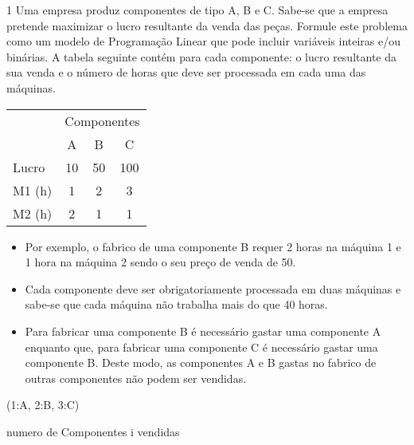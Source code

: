 \documentclass[\mainfilename]{subfiles}
\begin{document}
\begin{questionBox}1{ %
    Uma empresa produz componentes de tipo A, B e C. Sabe-se que a empresa pretende maximizar o lucro resultante da venda das peças. Formule este problema como um modelo de Programação Linear que pode incluir variáveis inteiras e/ou binárias.
} %
    A tabela seguinte contém para cada componente: o lucro resultante da sua venda e o número de horas que deve ser processada em cada uma das máquinas.
    \begin{center}
        \begin{tabular}{l *{3}{c}}
            
            \\\toprule
            
                & \multicolumn{3}{c}{Componentes}
                \\
                & \multicolumn{1}{c}{A}
                & \multicolumn{1}{c}{B}
                & \multicolumn{1}{c}{C}
            
            \\\midrule
            
                Lucro & 10 & 50 & 100
                \\ M1 (\unit{\hour}) & 1 & 2 & 3
                \\ M2 (\unit{\hour}) & 2 & 1 & 1
            
            \\\bottomrule
            
        \end{tabular}
    \end{center}

    \begin{itemize}[left=0em]
        \item Por exemplo, o fabrico de uma componente B requer 2 horas na máquina 1 e 1 hora na máquina 2 sendo o seu preço de venda de 50.
        \item Cada componente deve ser obrigatoriamente processada em duas máquinas e sabe-se que cada máquina não trabalha mais do que 40 horas.
        \item Para fabricar uma componente B é necessário gastar uma componente A enquanto que, para fabricar uma componente C é necessário gastar uma componente B. Deste modo, as componentes A e B gastas no fabrico de outras componentes não podem ser vendidas.
    \end{itemize}

    \begin{description}[
        leftmargin=!, 
        labelwidth=\widthof{\(x_i\)}
    ]
        \item[\(i\)] (1:A, 2:B, 3:C)
        \item[\(x_i\)] numero de Componentes i vendidas
    \end{description}


\end{questionBox}
\end{document}
